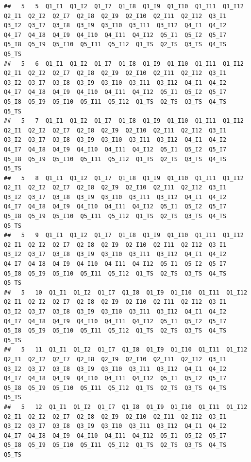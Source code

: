\documentclass[]{book}
\begin{document}
\begin{verbatim}
##   5   5  Q1_I1  Q1_I2  Q1_I7  Q1_I8  Q1_I9  Q1_I10  Q1_I11  Q1_I12  Q2_I1  Q2_I2  Q2_I7  Q2_I8  Q2_I9  Q2_I10  Q2_I11  Q2_I12  Q3_I1  Q3_I2  Q3_I7  Q3_I8  Q3_I9  Q3_I10  Q3_I11  Q3_I12  Q4_I1  Q4_I2  Q4_I7  Q4_I8  Q4_I9  Q4_I10  Q4_I11  Q4_I12  Q5_I1  Q5_I2  Q5_I7  Q5_I8  Q5_I9  Q5_I10  Q5_I11  Q5_I12  Q1_TS  Q2_TS  Q3_TS  Q4_TS  Q5_TS
##   5   6  Q1_I1  Q1_I2  Q1_I7  Q1_I8  Q1_I9  Q1_I10  Q1_I11  Q1_I12  Q2_I1  Q2_I2  Q2_I7  Q2_I8  Q2_I9  Q2_I10  Q2_I11  Q2_I12  Q3_I1  Q3_I2  Q3_I7  Q3_I8  Q3_I9  Q3_I10  Q3_I11  Q3_I12  Q4_I1  Q4_I2  Q4_I7  Q4_I8  Q4_I9  Q4_I10  Q4_I11  Q4_I12  Q5_I1  Q5_I2  Q5_I7  Q5_I8  Q5_I9  Q5_I10  Q5_I11  Q5_I12  Q1_TS  Q2_TS  Q3_TS  Q4_TS  Q5_TS
##   5   7  Q1_I1  Q1_I2  Q1_I7  Q1_I8  Q1_I9  Q1_I10  Q1_I11  Q1_I12  Q2_I1  Q2_I2  Q2_I7  Q2_I8  Q2_I9  Q2_I10  Q2_I11  Q2_I12  Q3_I1  Q3_I2  Q3_I7  Q3_I8  Q3_I9  Q3_I10  Q3_I11  Q3_I12  Q4_I1  Q4_I2  Q4_I7  Q4_I8  Q4_I9  Q4_I10  Q4_I11  Q4_I12  Q5_I1  Q5_I2  Q5_I7  Q5_I8  Q5_I9  Q5_I10  Q5_I11  Q5_I12  Q1_TS  Q2_TS  Q3_TS  Q4_TS  Q5_TS
##   5   8  Q1_I1  Q1_I2  Q1_I7  Q1_I8  Q1_I9  Q1_I10  Q1_I11  Q1_I12  Q2_I1  Q2_I2  Q2_I7  Q2_I8  Q2_I9  Q2_I10  Q2_I11  Q2_I12  Q3_I1  Q3_I2  Q3_I7  Q3_I8  Q3_I9  Q3_I10  Q3_I11  Q3_I12  Q4_I1  Q4_I2  Q4_I7  Q4_I8  Q4_I9  Q4_I10  Q4_I11  Q4_I12  Q5_I1  Q5_I2  Q5_I7  Q5_I8  Q5_I9  Q5_I10  Q5_I11  Q5_I12  Q1_TS  Q2_TS  Q3_TS  Q4_TS  Q5_TS
##   5   9  Q1_I1  Q1_I2  Q1_I7  Q1_I8  Q1_I9  Q1_I10  Q1_I11  Q1_I12  Q2_I1  Q2_I2  Q2_I7  Q2_I8  Q2_I9  Q2_I10  Q2_I11  Q2_I12  Q3_I1  Q3_I2  Q3_I7  Q3_I8  Q3_I9  Q3_I10  Q3_I11  Q3_I12  Q4_I1  Q4_I2  Q4_I7  Q4_I8  Q4_I9  Q4_I10  Q4_I11  Q4_I12  Q5_I1  Q5_I2  Q5_I7  Q5_I8  Q5_I9  Q5_I10  Q5_I11  Q5_I12  Q1_TS  Q2_TS  Q3_TS  Q4_TS  Q5_TS
##   5   10  Q1_I1  Q1_I2  Q1_I7  Q1_I8  Q1_I9  Q1_I10  Q1_I11  Q1_I12  Q2_I1  Q2_I2  Q2_I7  Q2_I8  Q2_I9  Q2_I10  Q2_I11  Q2_I12  Q3_I1  Q3_I2  Q3_I7  Q3_I8  Q3_I9  Q3_I10  Q3_I11  Q3_I12  Q4_I1  Q4_I2  Q4_I7  Q4_I8  Q4_I9  Q4_I10  Q4_I11  Q4_I12  Q5_I1  Q5_I2  Q5_I7  Q5_I8  Q5_I9  Q5_I10  Q5_I11  Q5_I12  Q1_TS  Q2_TS  Q3_TS  Q4_TS  Q5_TS
##   5   11  Q1_I1  Q1_I2  Q1_I7  Q1_I8  Q1_I9  Q1_I10  Q1_I11  Q1_I12  Q2_I1  Q2_I2  Q2_I7  Q2_I8  Q2_I9  Q2_I10  Q2_I11  Q2_I12  Q3_I1  Q3_I2  Q3_I7  Q3_I8  Q3_I9  Q3_I10  Q3_I11  Q3_I12  Q4_I1  Q4_I2  Q4_I7  Q4_I8  Q4_I9  Q4_I10  Q4_I11  Q4_I12  Q5_I1  Q5_I2  Q5_I7  Q5_I8  Q5_I9  Q5_I10  Q5_I11  Q5_I12  Q1_TS  Q2_TS  Q3_TS  Q4_TS  Q5_TS
##   5   12  Q1_I1  Q1_I2  Q1_I7  Q1_I8  Q1_I9  Q1_I10  Q1_I11  Q1_I12  Q2_I1  Q2_I2  Q2_I7  Q2_I8  Q2_I9  Q2_I10  Q2_I11  Q2_I12  Q3_I1  Q3_I2  Q3_I7  Q3_I8  Q3_I9  Q3_I10  Q3_I11  Q3_I12  Q4_I1  Q4_I2  Q4_I7  Q4_I8  Q4_I9  Q4_I10  Q4_I11  Q4_I12  Q5_I1  Q5_I2  Q5_I7  Q5_I8  Q5_I9  Q5_I10  Q5_I11  Q5_I12  Q1_TS  Q2_TS  Q3_TS  Q4_TS  Q5_TS

\end{verbatim}
\end{document}
